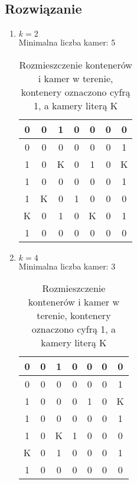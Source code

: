 \documentclass{article}
\begin{document}
\subsection{Rozwiązanie}
\begin{enumerate}[label=(\alph*)]
    \item $k = 2$\\
    Minimalna liczba kamer: 5
        \begin{table}[H]
            \centering
            \begin{tabular}{|c|c|c|c|c|c|c|}
                \hline
                0 & 0 & 1 & 0 & 0 & 0 & 0 \\
                \hline
                0 & 0 & 0 & 0 & 0 & 0 & 1 \\
                \hline
                1 & 0 & K & 0 & 1 & 0 & K \\
                \hline
                1 & 0 & 0 & 0 & 0 & 0 & 1 \\
                \hline
                1 & K & 0 & 1 & 0 & 0 & 0 \\
                \hline
                K & 0 & 1 & 0 & K & 0 & 1 \\
                \hline
                1 & 0 & 0 & 0 & 0 & 0 & 0 \\
                \hline
            \end{tabular}
            \caption{Rozmieszczenie kontenerów i kamer w terenie, kontenery oznaczono cyfrą 1, a kamery literą K}
        \end{table}
        \textbf{ }
    \item $k = 4$\\
    Minimalna liczba kamer: 3
        \begin{table}[H]
            \centering
            \begin{tabular}{|c|c|c|c|c|c|c|}
                \hline
                0 & 0 & 1 & 0 & 0 & 0 & 0 \\
                \hline
                0 & 0 & 0 & 0 & 0 & 0 & 1 \\
                \hline
                1 & 0 & 0 & 0 & 1 & 0 & K \\
                \hline
                1 & 0 & 0 & 0 & 0 & 0 & 1 \\
                \hline
                1 & 0 & K & 1 & 0 & 0 & 0 \\
                \hline
                K & 0 & 1 & 0 & 0 & 0 & 1 \\
                \hline
                1 & 0 & 0 & 0 & 0 & 0 & 0 \\
                \hline
            \end{tabular}
            \caption{Rozmieszczenie kontenerów i kamer w terenie, kontenery oznaczono cyfrą 1, a kamery literą K}
        \end{table}
\end{enumerate}
\end{document}
